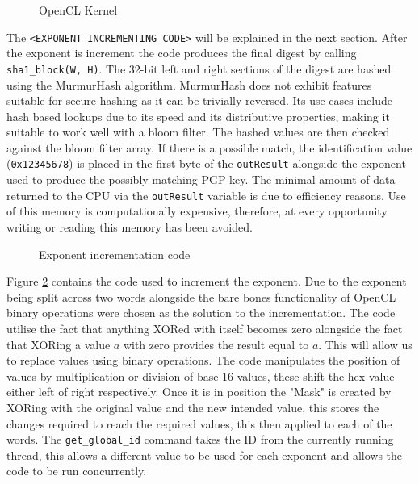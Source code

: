 \begin{figure}[!h]
  \centering
  
  \caption{OpenCL Kernel}
  \label{fig:opencl}
\end{figure}

The \verb|<EXPONENT_INCREMENTING_CODE>| will be explained in the next section. After the exponent is increment the code produces the final digest by calling \verb|sha1_block(W, H)|. The 32-bit left and right sections of the digest are hashed using the MurmurHash algorithm. MurmurHash does not exhibit features suitable for secure hashing as it can be trivially reversed. Its use-cases include hash based lookups due to its speed and its distributive properties, making it suitable to work well with a bloom filter. The hashed values are then checked against the bloom filter array. If there is a possible match, the identification value (\verb|0x12345678|) is placed in the first byte of the \verb|outResult| alongside the exponent used to produce the possibly matching PGP key. The minimal amount of data returned to the CPU via the \verb|outResult| variable is due to efficiency reasons. Use of this memory is computationally expensive, therefore, at every opportunity writing or reading this memory has been avoided.

\begin{figure}[!h]
  \centering
  
  \caption{Exponent incrementation code}
  \label{fig:increment}
\end{figure}

Figure \ref{fig:increment} contains the code used to increment the exponent. Due to the exponent being split across two words alongside the bare bones functionality of OpenCL binary operations were chosen as the solution to the incrementation. The code utilise the fact that anything XORed with itself becomes zero alongside the fact that XORing a value $a$ with zero provides the result equal to $a$. This will allow us to replace values using binary operations. The code manipulates the position of values by multiplication or division  of base-16 values, these shift the hex value either left of right respectively. Once it is in position the "Mask" is created by XORing with the original value and the new intended value, this stores the changes required to reach the required values, this then applied to each of the words.
The \verb|get_global_id| command takes the ID from the currently running thread, this allows a different value to be used for each exponent and allows the code to be run concurrently.

